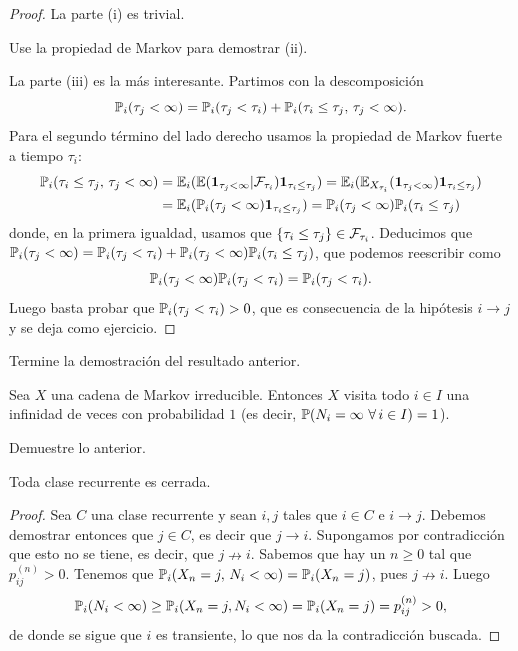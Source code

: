 \begin{proof}
La parte (i) es trivial.

\begin{exer}
Use la propiedad de Markov para demostrar (ii).
\end{exer}
\noindent La parte (iii) es la más interesante.
Partimos con la descomposición
\[\mathbb{P}_i(\tau_j<\infty)=\mathbb{P}_i(\tau_j<\tau_i)+\mathbb{P}_i(\tau_i\leq\tau_j,\,\tau_j<\infty).\]
Para el segundo término del lado derecho usamos la propiedad de Markov fuerte a tiempo $\tau_i$:
\begin{align}
\mathbb{P}_i(\tau_i\leq\tau_j,\,\tau_j<\infty)&=\mathbb{E}_i(\mathbb{E}(\mathbf{1}_{\tau_j<\infty}|\mathcal{F}_{\tau_i})\mathbf{1}_{\tau_i\leq\tau_j})=\mathbb{E}_i(\mathbb{E}_{X_{\tau_i}}(\mathbf{1}_{\tau_j<\infty})\mathbf{1}_{\tau_i\leq\tau_j})\\
&=\mathbb{E}_i(\mathbb{P}_i(\tau_j<\infty)\mathbf{1}_{\tau_i\leq\tau_j})=\mathbb{P}_i(\tau_j<\infty)\mathbb{P}_i(\tau_i\leq\tau_j)
\end{align}
donde, en la primera igualdad, usamos que $\{\tau_i\leq\tau_j\}\in\mathcal{F}_{\tau_i}$.
Deducimos que $\mathbb{P}_i(\tau_j<\infty)=\mathbb{P}_i(\tau_j<\tau_i)+\mathbb{P}_i(\tau_j<\infty)\mathbb{P}_i(\tau_i\leq\tau_j)$, que podemos reescribir como
\[\mathbb{P}_i(\tau_j<\infty)\mathbb{P}_i(\tau_j<\tau_i)=\mathbb{P}_i(\tau_j<\tau_i).\]
Luego basta probar que $\mathbb{P}_i(\tau_j<\tau_i)>0$, que es consecuencia de la hipótesis $i\rightarrow j$ y se deja como ejercicio.
\end{proof}

\begin{exer}
Termine la demostración del resultado anterior.
\end{exer}

\begin{cor}
Sea $X$ una cadena de Markov irreducible.
Entonces $X$ visita todo $i\in I$ una infinidad de veces con probabilidad $1$ (es decir, $\mathbb{P}(N_i=\infty~\forall\,i\in I)=1$).
\end{cor}

\begin{exer}
Demuestre lo anterior.
\end{exer}

\NAM[]{\newpage}

\begin{prop}
Toda clase recurrente es cerrada.
\end{prop}

\begin{proof}
Sea $C$ una clase recurrente y sean $i,j$ tales que $i\in C$ e $i\rightarrow j$.
Debemos demostrar entonces que $j\in C$, es decir que $j\rightarrow i$.
Supongamos por contradicción que esto no se tiene, es decir, que $j\nrightarrow i$.
Sabemos que hay un $n\geq0$ tal que $p_{ij}^{(n)}>0$.
Tenemos que $\mathbb{P}_i(X_n=j,\,N_i<\infty)=\mathbb{P}_i(X_n=j)$, pues $j\nrightarrow i$.
Luego
\[\mathbb{P}_i(N_i<\infty)\geq\mathbb{P}_i(X_n=j,N_i<\infty)=\mathbb{P}_i(X_n=j)=p_{ij}^{(n)}>0,\]
de donde se sigue que $i$ es transiente, lo que nos da la contradicción buscada.
\end{proof}


